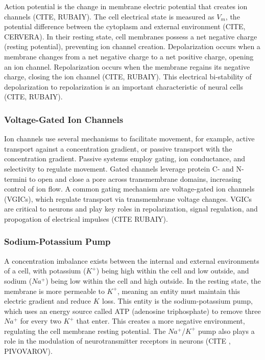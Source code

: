 \documentclass{article} %
\begin{document}
\begin{multicols}{2}
Action potential is the change in membrane electric potential that creates ion channels (CITE, RUBAIY). The cell electrical state is measured as $V_{m}$, the potential difference between the cytoplasm and external environment (CITE, CERVERA). In their resting state, cell membranes possess a net negative charge (resting potential), preventing ion channel creation. Depolarization occurs when a membrane changes from a net negative charge to a net positive charge, opening an ion channel. Repolarization occurs when the membrane regains its negative charge, closing the ion channel (CITE, RUBAIY). This electrical bi-stability of depolarization to repolarization is an important characteristic of neural cells (CITE, RUBAIY).

\subsubsection{Voltage-Gated Ion Channels}
\label{subsubsec:vgic}

Ion channels use several mechanisms to facilitate movement, for example, active transport against a concentration gradient, or passive transport with the concentration gradient. Passive systems employ gating, ion conductance, and selectivity to regulate movement. Gated channels leverage protein C- and N-termini to open and close a pore across transmembrane domains, increasing control of ion flow. A common gating mechanism are voltage-gated ion channels (VGICs), which regulate transport via transmembrane voltage changes. VGICs are critical to neurons and play key roles in repolarization, signal regulation, and propogation of electrical impulses (CITE RUBAIY). 

\subsubsection{Sodium-Potassium Pump}
\label{subsubsec:na_k_pump}

A concentration imbalance exists between the internal and external environments of a cell, with potassium ($K^{+}$) being high within the cell and low outside, and sodium ($Na^{+}$) being low within the cell and high outside. In the resting state, the membrane is more permeable to $K^{+}$, meaning an entity must maintain this electric gradient and reduce $K^{}$ loss. This entity is the sodium-potassium pump, which uses an energy source called ATP (adenosine triphosphate) to remove three $Na^{+}$ for every two $K^{+}$ that enter. This creates a more negative environment, regulating the cell membrane resting potential. The $Na^{+}$/$K^{+}$ pump also plays a role in the modulation of neurotransmitter receptors in neurons (CITE , PIVOVAROV). 


\end{multicols}
\end{document}
